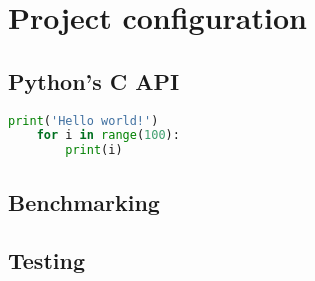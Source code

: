 \chapter{Project configuration}


\section{Python's C API}
\begin{lstlisting}[language=Python]
    print('Hello world!')
    for i in range(100):
        print(i)
\end{lstlisting}


\section{Benchmarking}


\section{Testing}
